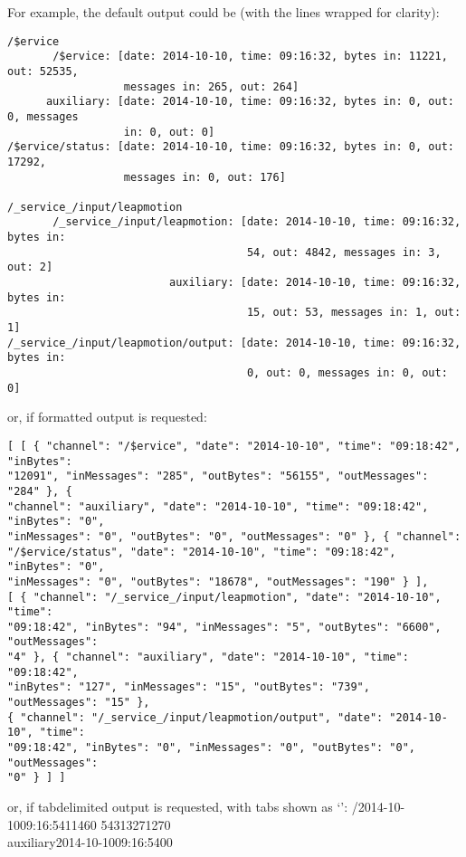 For example, the default output could be (with the lines wrapped for clarity):
\outputBegin
\begin{verbatim}
/$ervice
       /$ervice: [date: 2014-10-10, time: 09:16:32, bytes in: 11221, out: 52535,
                  messages in: 265, out: 264]
      auxiliary: [date: 2014-10-10, time: 09:16:32, bytes in: 0, out: 0, messages
                  in: 0, out: 0]
/$ervice/status: [date: 2014-10-10, time: 09:16:32, bytes in: 0, out: 17292,
                  messages in: 0, out: 176]

/_service_/input/leapmotion
       /_service_/input/leapmotion: [date: 2014-10-10, time: 09:16:32, bytes in:
                                     54, out: 4842, messages in: 3, out: 2]
                         auxiliary: [date: 2014-10-10, time: 09:16:32, bytes in:
                                     15, out: 53, messages in: 1, out: 1]
/_service_/input/leapmotion/output: [date: 2014-10-10, time: 09:16:32, bytes in:
                                     0, out: 0, messages in: 0, out: 0]
\end{verbatim}
\outputEnd
\condPage{}
or, if \json\longDash{}formatted output is requested:
\outputBegin
\begin{verbatim}
[ [ { "channel": "/$ervice", "date": "2014-10-10", "time": "09:18:42", "inBytes":
"12091", "inMessages": "285", "outBytes": "56155", "outMessages": "284" }, {
"channel": "auxiliary", "date": "2014-10-10", "time": "09:18:42", "inBytes": "0",
"inMessages": "0", "outBytes": "0", "outMessages": "0" }, { "channel":
"/$ervice/status", "date": "2014-10-10", "time": "09:18:42", "inBytes": "0",
"inMessages": "0", "outBytes": "18678", "outMessages": "190" } ],
[ { "channel": "/_service_/input/leapmotion", "date": "2014-10-10", "time":
"09:18:42", "inBytes": "94", "inMessages": "5", "outBytes": "6600", "outMessages":
"4" }, { "channel": "auxiliary", "date": "2014-10-10", "time": "09:18:42",
"inBytes": "127", "inMessages": "15", "outBytes": "739", "outMessages": "15" },
{ "channel": "/_service_/input/leapmotion/output", "date": "2014-10-10", "time":
"09:18:42", "inBytes": "0", "inMessages": "0", "outBytes": "0", "outMessages":
"0" } ] ]
\end{verbatim}
\outputEnd{}
or, if tab\longDash{}delimited output is requested, with tabs shown as `\tabSymbol':
\outputBegin{}
/\dollarService\pseudotab{}2014-10-10\pseudotab{}09:16:54\pseudotab{}11460%
\pseudotab{}54313\pseudotab{}271\pseudotab{}270\\
auxiliary\pseudotab{}2014-10-10\pseudotab{}09:16:54\pseudotab{}0\pseudotab{}0\pseudotab{}%
